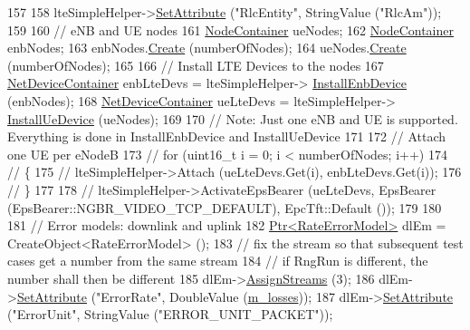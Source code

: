 \begin{DoxyCode}
157 
158   lteSimpleHelper->\hyperlink{classns3_1_1ObjectBase_ac60245d3ea4123bbc9b1d391f1f6592f}{SetAttribute} (\textcolor{stringliteral}{"RlcEntity"}, StringValue (\textcolor{stringliteral}{"RlcAm"}));
159 
160   \textcolor{comment}{// eNB and UE nodes}
161   \hyperlink{classns3_1_1NodeContainer}{NodeContainer} ueNodes;
162   \hyperlink{classns3_1_1NodeContainer}{NodeContainer} enbNodes;
163   enbNodes.\hyperlink{classns3_1_1NodeContainer_a787f059e2813e8b951cc6914d11dfe69}{Create} (numberOfNodes);
164   ueNodes.\hyperlink{classns3_1_1NodeContainer_a787f059e2813e8b951cc6914d11dfe69}{Create} (numberOfNodes);
165 
166   \textcolor{comment}{// Install LTE Devices to the nodes}
167   \hyperlink{classns3_1_1NetDeviceContainer}{NetDeviceContainer} enbLteDevs = lteSimpleHelper->
      \hyperlink{classns3_1_1LteSimpleHelper_a406e71dd8dcda8fa2f9a9fc31ff6494a}{InstallEnbDevice} (enbNodes);
168   \hyperlink{classns3_1_1NetDeviceContainer}{NetDeviceContainer} ueLteDevs = lteSimpleHelper->
      \hyperlink{classns3_1_1LteSimpleHelper_aa575a9480b50754a2a01e038ca5c5f27}{InstallUeDevice} (ueNodes);
169 
170   \textcolor{comment}{// Note: Just one eNB and UE is supported. Everything is done in InstallEnbDevice and InstallUeDevice}
171 
172   \textcolor{comment}{// Attach one UE per eNodeB}
173   \textcolor{comment}{// for (uint16\_t i = 0; i < numberOfNodes; i++)}
174   \textcolor{comment}{//   \{}
175   \textcolor{comment}{//     lteSimpleHelper->Attach (ueLteDevs.Get(i), enbLteDevs.Get(i));}
176   \textcolor{comment}{//   \}}
177 
178   \textcolor{comment}{//   lteSimpleHelper->ActivateEpsBearer (ueLteDevs, EpsBearer (EpsBearer::NGBR\_VIDEO\_TCP\_DEFAULT),
       EpcTft::Default ());}
179 
180 
181   \textcolor{comment}{// Error models: downlink and uplink}
182   \hyperlink{classns3_1_1Ptr}{Ptr<RateErrorModel>} dlEm = CreateObject<RateErrorModel> ();
183   \textcolor{comment}{// fix the stream so that subsequent test cases get a number from the same stream}
184   \textcolor{comment}{// if RngRun is different, the number shall then be different}
185   dlEm->\hyperlink{classns3_1_1RateErrorModel_a759d58c787549d27e35729a4a850648a}{AssignStreams} (3);
186   dlEm->\hyperlink{classns3_1_1ObjectBase_ac60245d3ea4123bbc9b1d391f1f6592f}{SetAttribute} (\textcolor{stringliteral}{"ErrorRate"}, DoubleValue (\hyperlink{classLteRlcAmE2eTestCase_afbb72ea6f3599c57b19be03be5e43878}{m\_losses}));
187   dlEm->\hyperlink{classns3_1_1ObjectBase_ac60245d3ea4123bbc9b1d391f1f6592f}{SetAttribute} (\textcolor{stringliteral}{"ErrorUnit"}, StringValue (\textcolor{stringliteral}{"ERROR\_UNIT\_PACKET"}));

\end{DoxyCode}
